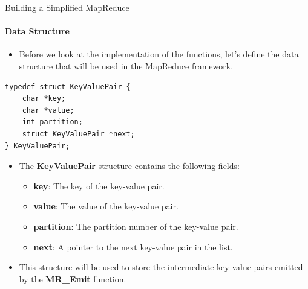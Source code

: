 \documentclass[10pt]{beamer}
\begin{document}
\begin{frame}[fragile]{Building a Simplified MapReduce}
    \framesubtitle{Data Structure}
    \begin{itemize}
        \item Before we look at the implementation of the functions, let's define the data structure that will be used in the MapReduce framework.
    \end{itemize}
    \begin{lstlisting}
typedef struct KeyValuePair {
    char *key;
    char *value;
    int partition;
    struct KeyValuePair *next;
} KeyValuePair;
              \end{lstlisting}
    \begin{itemize}
        \item The \textbf{KeyValuePair} structure contains the following fields:
              \begin{itemize}
                  \item \textbf{key}: The key of the key-value pair.
                  \item \textbf{value}: The value of the key-value pair.
                  \item \textbf{partition}: The partition number of the key-value pair.
                  \item \textbf{next}: A pointer to the next key-value pair in the list.
              \end{itemize}
        \item This structure will be used to store the intermediate key-value pairs emitted by the \textbf{MR\_Emit} function.
    \end{itemize}
\end{frame}
\end{document}

